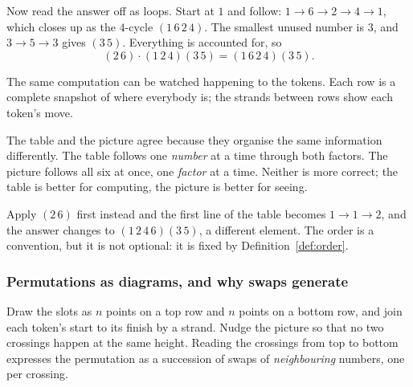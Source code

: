 Now read the answer off as loops. Start at $1$ and follow: $1\to6\to2\to4\to1$, which closes up as
the $4$-cycle $(1\,6\,2\,4)$. The smallest unused number is $3$, and $3\to5\to3$ gives $(3\,5)$.
Everything is accounted for, so
\[(2\,6)\cdot(1\,2\,4)(3\,5)=(1\,6\,2\,4)(3\,5).\]


The same computation can be watched happening to the tokens. Each row is a complete snapshot of
where everybody is; the strands between rows show each token's move.


\begin{why}
The table and the picture agree because they organise the same information differently. The table
follows one \emph{number} at a time through both factors. The picture follows all six at once,
one \emph{factor} at a time. Neither is more correct; the table is better for computing, the picture
is better for seeing.
\end{why}

\begin{pitfall}
Apply $(2\,6)$ first instead and the first line of the table becomes $1\to1\to2$, and the answer
changes to $(1\,2\,4\,6)(3\,5)$, a different element. The order is a convention, but it is not
optional: it is fixed by Definition~\ref{def:order}.
\end{pitfall}

\subsubsection*{Permutations as diagrams, and why swaps generate}

Draw the slots as $n$ points on a top row and $n$ points on a bottom row, and join each token's
start to its finish by a strand. Nudge the picture so that no two crossings happen at the same
height. Reading the crossings from top to bottom expresses the permutation as a succession of swaps
of \emph{neighbouring} numbers, one per crossing.



